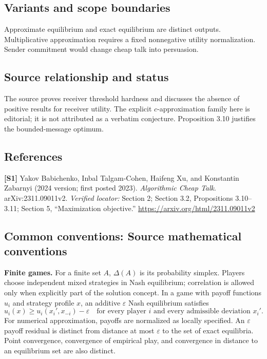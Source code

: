 \documentclass[11pt,a4paper]{article}
\begin{document}
\subsection*{Variants and scope boundaries}
Approximate equilibrium and exact equilibrium are distinct outputs. Multiplicative approximation requires a fixed nonnegative utility normalization. Sender commitment would change cheap talk into persuasion.
\subsection*{Source relationship and status}
The source proves receiver threshold hardness and discusses the absence of positive results for receiver utility. The explicit $c$-approximation family here is editorial; it is not attributed as a verbatim conjecture. Proposition 3.10 justifies the bounded-message optimum.
\subsection*{References}
\begingroup\footnotesize\raggedright
\textbf{[S1]} Yakov Babichenko, Inbal Talgam-Cohen, Haifeng Xu, and Konstantin Zabarnyi (2024 version; first posted 2023). \emph{Algorithmic Cheap Talk}. arXiv:2311.09011v2. \textit{Verified locator:} Section 2; Section 3.2, Propositions 3.10--3.11; Section 5, ``Maximization objective.'' \url{https://arxiv.org/html/2311.09011v2}
\par\endgroup

\subsection*{Common conventions: Source mathematical conventions}

\textbf{Finite games.} For a finite set $A$, $\Delta(A)$ is its probability
simplex. Players choose independent mixed strategies in Nash equilibrium;
correlation is allowed only when explicitly part of the solution concept.
In a game with payoff functions $u_i$ and strategy profile $x$, an additive
$\varepsilon$ Nash equilibrium satisfies
\[
 u_i(x)\geq u_i(x_i',x_{-i})-\varepsilon
 \quad\text{for every player $i$ and every admissible deviation $x_i'$}.
\]
For numerical approximation, payoffs are normalized as locally specified.
An $\varepsilon$ payoff residual is distinct from distance at most
$\varepsilon$ to the set of exact equilibria. Point convergence, convergence
of empirical play, and convergence in distance to an equilibrium set are
also distinct.
\end{document}
